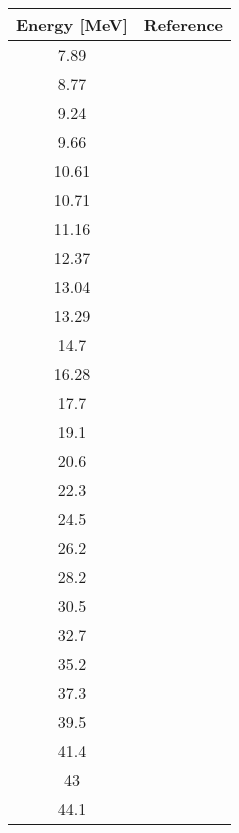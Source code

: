 \begin{tabular}{c c} 
    \toprule
    \bf{Energy [MeV]} & \bf{Reference} \\
    \midrule
    7.89 & \cite{Stevens1966}\\
    8.77 & \cite{Stevens1966}\\
    9.24 & \cite{Stevens1966}\\
    9.66 & \cite{Stevens1966}\\
    10.61 & \cite{Stevens1966}\\
    10.71 & \cite{Stevens1966}\\
    11.16 & \cite{Stevens1966}\\
    12.37 & \cite{Stevens1966}\\
    13.04 & \cite{Stevens1966}\\
    13.29 & \cite{Stevens1966}\\
    14.7 & \cite{Fabrici80}\\
    16.28 & \cite{Stevens1966}\\
    17.7 & \cite{Fabrici80}\\
    19.1 & \cite{Fabrici80}\\
    20.6 & \cite{Fabrici80}\\
    22.3 & \cite{Fabrici80}\\
    24.5 & \cite{Fabrici80}\\
    26.2 & \cite{Fabrici80}\\
    28.2 & \cite{Fabrici80}\\
    30.5 & \cite{Fabrici80}\\
    32.7 & \cite{Fabrici80}\\
    35.2 & \cite{Colombo77}\\
    37.3 & \cite{Fabrici80}\\
    39.5 & \cite{Fabrici80}\\
    41.4 & \cite{Fabrici80}\\
    43 & \cite{Khan2000}\\
    44.1 & \cite{Fabrici80}\\
    \bottomrule
\end{tabular}
